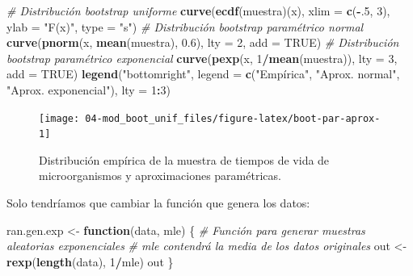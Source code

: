\documentclass[]{book}
\newenvironment{Shaded}{\begin{snugshade}}{\end{snugshade}}
\newcommand{\KeywordTok}[1]{\textcolor[rgb]{0.13,0.29,0.53}{\textbf{#1}}}
\newcommand{\DataTypeTok}[1]{\textcolor[rgb]{0.13,0.29,0.53}{#1}}
\newcommand{\DecValTok}[1]{\textcolor[rgb]{0.00,0.00,0.81}{#1}}
\newcommand{\FloatTok}[1]{\textcolor[rgb]{0.00,0.00,0.81}{#1}}
\newcommand{\StringTok}[1]{\textcolor[rgb]{0.31,0.60,0.02}{#1}}
\newcommand{\CommentTok}[1]{\textcolor[rgb]{0.56,0.35,0.01}{\textit{#1}}}
\newcommand{\OtherTok}[1]{\textcolor[rgb]{0.56,0.35,0.01}{#1}}
\newcommand{\ControlFlowTok}[1]{\textcolor[rgb]{0.13,0.29,0.53}{\textbf{#1}}}
\newcommand{\OperatorTok}[1]{\textcolor[rgb]{0.81,0.36,0.00}{\textbf{#1}}}
\newcommand{\NormalTok}[1]{#1}
\theoremstyle{definition}
\theoremstyle{definition}
\theoremstyle{definition}
\theoremstyle{remark}
\begin{document}
\begin{Shaded}
\begin{Highlighting}[]
\CommentTok{# Distribución bootstrap uniforme}
\KeywordTok{curve}\NormalTok{(}\KeywordTok{ecdf}\NormalTok{(muestra)(x), }\DataTypeTok{xlim =} \KeywordTok{c}\NormalTok{(}\OperatorTok{-}\NormalTok{.}\DecValTok{5}\NormalTok{, }\DecValTok{3}\NormalTok{), }\DataTypeTok{ylab =} \StringTok{"F(x)"}\NormalTok{, }\DataTypeTok{type =} \StringTok{"s"}\NormalTok{)}
\CommentTok{# Distribución bootstrap paramétrico normal}
\KeywordTok{curve}\NormalTok{(}\KeywordTok{pnorm}\NormalTok{(x, }\KeywordTok{mean}\NormalTok{(muestra), }\FloatTok{0.6}\NormalTok{), }\DataTypeTok{lty =} \DecValTok{2}\NormalTok{, }\DataTypeTok{add =} \OtherTok{TRUE}\NormalTok{)}
\CommentTok{# Distribución bootstrap paramétrico exponencial}
\KeywordTok{curve}\NormalTok{(}\KeywordTok{pexp}\NormalTok{(x, }\DecValTok{1}\OperatorTok{/}\KeywordTok{mean}\NormalTok{(muestra)), }\DataTypeTok{lty =} \DecValTok{3}\NormalTok{, }\DataTypeTok{add =} \OtherTok{TRUE}\NormalTok{)}
\KeywordTok{legend}\NormalTok{(}\StringTok{"bottomright"}\NormalTok{, }\DataTypeTok{legend =} \KeywordTok{c}\NormalTok{(}\StringTok{"Empírica"}\NormalTok{, }\StringTok{"Aprox. normal"}\NormalTok{, }\StringTok{"Aprox. exponencial"}\NormalTok{), }\DataTypeTok{lty =} \DecValTok{1}\OperatorTok{:}\DecValTok{3}\NormalTok{)}
\end{Highlighting}
\end{Shaded}

\begin{figure}[!htb]

{\centering \texttt{[image: 04-mod\_boot\_unif\_files/figure-latex/boot-par-aprox-1]} 

}

\caption{Distribución empírica de la muestra de tiempos de vida de microorganismos y aproximaciones paramétricas.}\label{fig:boot-par-aprox}
\end{figure}

Solo tendríamos que cambiar la función que genera los datos:

\begin{Shaded}
\begin{Highlighting}[]
\NormalTok{ran.gen.exp <-}\StringTok{ }\ControlFlowTok{function}\NormalTok{(data, mle) \{}
    \CommentTok{# Función para generar muestras aleatorias exponenciales}
    \CommentTok{# mle contendrá la media de los datos originales}
\NormalTok{    out <-}\StringTok{ }\KeywordTok{rexp}\NormalTok{(}\KeywordTok{length}\NormalTok{(data), }\DecValTok{1}\OperatorTok{/}\NormalTok{mle)}
\NormalTok{    out}
\NormalTok{\}}
\end{Highlighting}
\end{Shaded}
\end{document}
